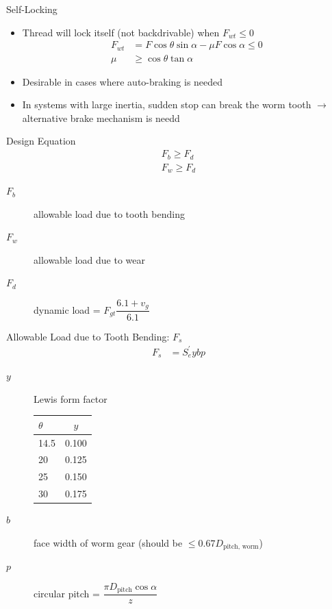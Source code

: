 \documentclass[
10pt,
a4paper,
openany,
svgnames,
]{book}
\begin{document}
\begin{frame}{Self-Locking}
  \begin{itemize}
    \item Thread will lock itself (not backdrivable) when $F_{wt} \leqslant 0$
          \begin{align*}
            F_{wt} &= F \cos \theta \sin \alpha - \mu F \cos \alpha \leqslant 0 \\
            \mu &\geqslant \cos \theta \tan \alpha
          \end{align*}
    \item Desirable in cases where auto-braking is needed
    \item In systems with large inertia, sudden stop can break the worm tooth $\rightarrow$ alternative brake mechanism is needd
  \end{itemize}
\end{frame}

\begin{frame}{Design Equation}
  \begin{align*}
    F_{b} \geqslant F_{d} \\
    F_{w} \geqslant F_{d}
  \end{align*}
  \begin{description}
    \item[$F_{b}$] allowable load due to tooth bending
    \item[$F_{w}$] allowable load due to wear
    \item[$F_{d}$] dynamic load = $F_{gt} \dfrac{6.1 + v_{g}}{6.1} $
  \end{description}
\end{frame}

\begin{frame}{Allowable Load due to Tooth Bending: $F_{s}$}
  \begin{align*}
    F_{s} &= S_{e}^{\prime}ybp
  \end{align*}
  \begin{description}
    \item[$y$] Lewis form factor
  \begin{table}[htbp]
    \centering
    \begin{tabular}{lc}
      \toprule
      $\theta$ & $y$ \\
      \midrule
      14.5 & 0.100 \\
      20 & 0.125 \\
      25 & 0.150 \\
      30 & 0.175 \\
      \bottomrule
    \end{tabular}
  \end{table}
    \item[$b$] face width of worm gear (should be $\leqslant 0.67D_{\text{pitch, worm}}$)
    \item[$p$] circular pitch = $\dfrac{\pi D_{\text{pitch}} \cos \alpha}{z}$
  \end{description}
\end{frame}
\end{document}
